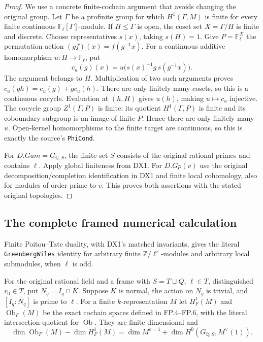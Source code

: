 \begin{proof}
We use a concrete finite-cochain argument that avoids changing the
original group.  Let $\Gamma$ be a profinite group for which
$H^1(\Gamma,M)$ is finite for every finite continuous
$\mathbb F_\ell[\Gamma]$-module.  If $H\le\Gamma$ is open,
the coset set $X=\Gamma/H$ is finite and discrete.
Choose representatives $s(x)$, taking $s(H)=1$.
Give $P=\mathbb F_\ell^X$ the permutation action
$(g f)(x)=f(g^{-1}x)$.
For a continuous additive homomorphism $u:H\to\mathbb F_\ell$,
put
\[
       c_u(g)(x)=u\bigl(s(x)^{-1}g\,s(g^{-1}x)\bigr).
 \tag{DX.11}
\]
The argument belongs to $H$.  Multiplication of two such
arguments proves $c_u(gh)=c_u(g)+g c_u(h)$.
There are only finitely many cosets, so this is a continuous
cocycle.  Evaluation at $(h,H)$ gives $u(h)$, making
$u\mapsto c_u$ injective.
The cocycle group $Z^1(\Gamma,P)$ is finite: its quotient
$H^1(\Gamma,P)$ is finite and its coboundary subgroup is an
image of finite $P$.  Hence there are only finitely many $u$.
Open-kernel homomorphisms to the finite target are continuous,
so this is exactly the source's \texttt{PhiCond}.

For $D.Gam=G_{\mathbb Q,S}$, the finite set $S$ consists of the
original rational primes and contains $\ell$.  Apply global
finiteness from DX1.  For $D.Gp(v)$ use the original
decomposition/completion identification in DX1 and finite
local cohomology, also for modules of order prime to $v$.
This proves both assertions with the stated original topologies.
\end{proof}

\subsection{The complete framed numerical calculation}

\begin{proposition}
\label{claim:DX3}
Finite Poitou--Tate duality, with DX1's matched invariants, gives
the literal \texttt{GreenbergWiles} identity for arbitrary finite
$\mathbb Z/\ell^r$-modules and arbitrary local submodules, when
$\ell$ is odd.

For the original rational field and a frame with
$S=T\sqcup Q$, $\ell\in T$, distinguished $v_0\in T$, put
$N_q=I_q\cap K$.  Suppose $K$ is normal, the action on $N_q$
is trivial, and $[I_q:N_q]$ is prime to $\ell$.
For a finite $k$-representation $M$ let $H^1_F(M)$ and
$\operatorname{Ob}_F(M)$ be the exact cochain spaces defined in
FP.4--FP.6, with the literal intersection quotient for
$\operatorname{Ob}$.  They are finite dimensional and
\[
 \dim\operatorname{Ob}_F(M)-\dim H^1_F(M)
       =\dim M^{c=1}+\dim H^0(G_{\mathbb Q,S},M^\vee(1)).
 \tag{DX.12}
\]
\end{proposition}

